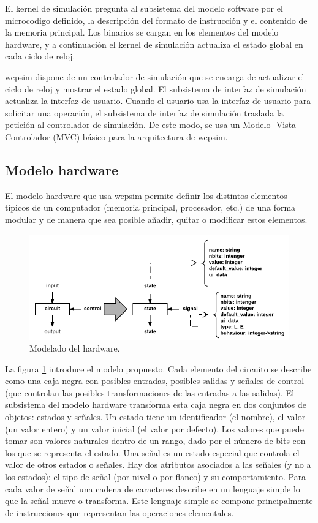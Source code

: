 El kernel de simulación pregunta al subsistema del modelo \gls{software} por el \gls{microcodigo} definido, la descripción del formato de instrucción y el contenido de la memoria principal. Los binarios se cargan en los elementos del modelo \gls{hardware}, y a continuación el kernel de simulación actualiza el estado global en cada ciclo de reloj.


\acrshort{wepsim} dispone de un controlador de simulación que se encarga de actualizar el ciclo de reloj y mostrar el estado global. El subsistema de interfaz de simulación actualiza la interfaz de usuario. Cuando el usuario usa la interfaz de usuario para solicitar una operación, el subsistema de interfaz de simulación traslada la petición al controlador de simulación. De este modo, se usa un Modelo- Vista-Controlador (MVC) básico para la arquitectura de \acrshort{wepsim}.

\subsection{Modelo \gls{hardware}}

El modelo \gls{hardware} que usa \acrshort{wepsim} permite definir los distintos elementos típicos de un computador (memoria principal, procesador, etc.) de una forma modular y de manera que sea posible añadir, quitar o modificar estos elementos.

\begin{figure}[htbp]
 	\centering
 	\includegraphics[width=14cm]{figures/hardware_model}
 	\caption{Modelado del \gls{hardware}.}
	\label{fig:hardware_model_diagram}
\end{figure}

La figura \ref{fig:hardware_model_diagram} introduce el modelo propuesto. Cada elemento del circuito se describe como una caja negra con posibles entradas, posibles salidas y señales de control (que controlan las posibles transformaciones de las entradas a las salidas). El subsistema del modelo \gls{hardware} transforma esta caja negra en dos conjuntos de objetos: estados y señales. Un estado tiene un identificador (el nombre), el valor (un valor entero) y un valor inicial (el valor por defecto). Los valores que puede tomar son valores naturales dentro de un rango, dado por el número de bits con los que se representa el estado. Una señal es un estado especial que controla el valor de otros estados o señales. Hay dos atributos asociados a las señales (y no a los estados): el tipo de señal (por nivel o por flanco) y su comportamiento. Para cada valor de señal una cadena de caracteres describe en un lenguaje simple lo que la señal mueve o transforma. Este lenguaje simple se compone principalmente de instrucciones que representan las operaciones elementales.

